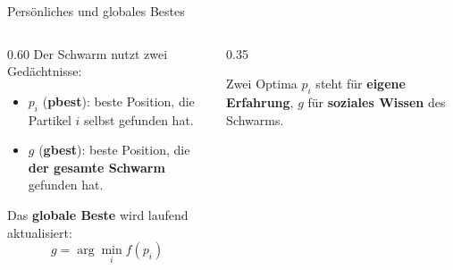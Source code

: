 \begin{frame}{Persönliches und globales Bestes}
\begin{columns}[T]
\begin{column}{0.60\textwidth}
Der Schwarm nutzt zwei Gedächtnisse:
\begin{itemize}
\item $p_i$ (\textbf{pbest}): beste Position, die Partikel $i$ selbst gefunden hat.
\item $g$ (\textbf{gbest}): beste Position, die \textbf{der gesamte Schwarm} gefunden hat.
\end{itemize}

\vspace{0.5em}
Das \textbf{globale Beste} wird laufend aktualisiert:
\[
g = \arg\min_{i} f(p_i)
\]
\end{column}
\begin{column}{0.35\textwidth}
\begin{block}{Zwei Optima}
$p_i$ steht für \textbf{eigene Erfahrung}, $g$ für \textbf{soziales Wissen} des Schwarms.
\end{block}
\end{column}
\end{columns}
\end{frame}

